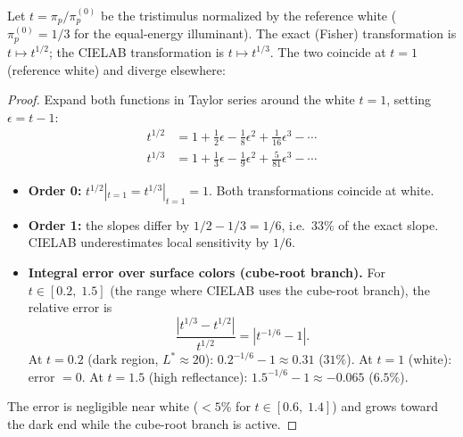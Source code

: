 \documentclass[12pt,a4paper]{article}
\begin{document}
\begin{derivedbox}
Let $t = \pi_p / \pi_p^{(0)}$ be the tristimulus normalized by the
reference white ($\pi_p^{(0)} = 1/3$ for the equal-energy illuminant).
The exact (Fisher) transformation is $t \mapsto t^{1/2}$; the CIELAB
transformation is $t \mapsto t^{1/3}$. The two coincide at $t = 1$
(reference white) and diverge elsewhere:

\begin{proof}
Expand both functions in Taylor series around the white $t = 1$,
setting $\epsilon = t - 1$:
\begin{align}
  t^{1/2} &= 1 + \tfrac{1}{2}\epsilon - \tfrac{1}{8}\epsilon^2
    + \tfrac{1}{16}\epsilon^3 - \cdots \tag{Fisher exact} \\
  t^{1/3} &= 1 + \tfrac{1}{3}\epsilon - \tfrac{1}{9}\epsilon^2
    + \tfrac{5}{81}\epsilon^3 - \cdots \tag{CIELAB}
\end{align}
\begin{itemize}[nosep]
\item \textbf{Order 0:} $t^{1/2}|_{t=1} = t^{1/3}|_{t=1} = 1$. Both
  transformations coincide at white.
\item \textbf{Order 1:} the slopes differ by $1/2 - 1/3 = 1/6$, i.e.\
  $33\%$ of the exact slope. CIELAB underestimates local sensitivity
  by $1/6$.
\item \textbf{Integral error over surface colors (cube-root branch).}
  For $t \in [0.2,\; 1.5]$ (the range where CIELAB uses the cube-root
  branch), the relative error is
  \[
    \frac{|t^{1/3} - t^{1/2}|}{t^{1/2}} = |t^{-1/6} - 1|.
  \]
  At $t = 0.2$ (dark region, $L^* \approx 20$):
  $0.2^{-1/6} - 1 \approx 0.31$ ($31\%$). At $t = 1$ (white):
  error $= 0$. At $t = 1.5$ (high reflectance):
  $1.5^{-1/6} - 1 \approx -0.065$ ($6.5\%$).
\end{itemize}
The error is negligible near white ($< 5\%$ for $t \in [0.6,\; 1.4]$)
and grows toward the dark end while the cube-root branch is active.
\end{proof}
\end{derivedbox}
\end{document}
